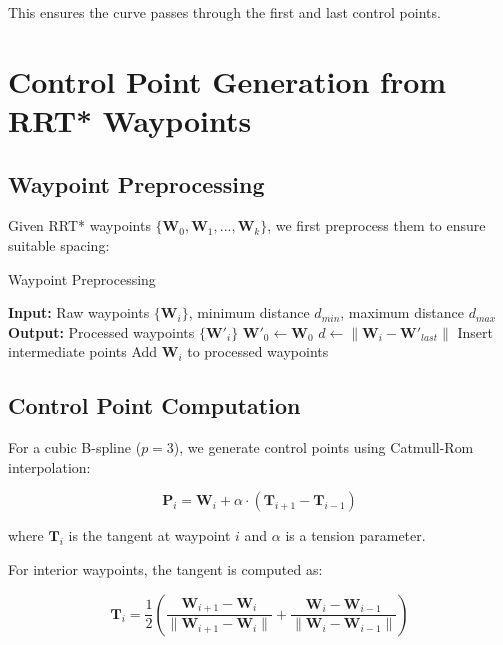 \documentclass[11pt]{article}
\begin{document}
This ensures the curve passes through the first and last control points.

\section{Control Point Generation from RRT* Waypoints}

\subsection{Waypoint Preprocessing}

Given RRT* waypoints $\{\mathbf{W}_0, \mathbf{W}_1, ..., \mathbf{W}_k\}$, we first preprocess them to ensure suitable spacing:

\begin{algorithm}
\caption{Waypoint Preprocessing}
\begin{algorithmic}
\STATE \textbf{Input:} Raw waypoints $\{\mathbf{W}_i\}$, minimum distance $d_{min}$, maximum distance $d_{max}$
\STATE \textbf{Output:} Processed waypoints $\{\mathbf{W}'_i\}$
\STATE $\mathbf{W}'_0 \leftarrow \mathbf{W}_0$
    \STATE $d \leftarrow \|\mathbf{W}_i - \mathbf{W}'_{last}\|$
            \STATE Insert intermediate points
        \ENDIF
        \STATE Add $\mathbf{W}_i$ to processed waypoints
    \ENDIF
\ENDFOR
\end{algorithmic}
\end{algorithm}

\subsection{Control Point Computation}

For a cubic B-spline ($p = 3$), we generate control points using Catmull-Rom interpolation:

\begin{equation}
\mathbf{P}_i = \mathbf{W}_i + \alpha \cdot (\mathbf{T}_{i+1} - \mathbf{T}_{i-1})
\end{equation}

where $\mathbf{T}_i$ is the tangent at waypoint $i$ and $\alpha$ is a tension parameter.

For interior waypoints, the tangent is computed as:

\begin{equation}
\mathbf{T}_i = \frac{1}{2} \left( \frac{\mathbf{W}_{i+1} - \mathbf{W}_i}{\|\mathbf{W}_{i+1} - \mathbf{W}_i\|} + \frac{\mathbf{W}_i - \mathbf{W}_{i-1}}{\|\mathbf{W}_i - \mathbf{W}_{i-1}\|} \right)
\end{equation}
\end{document}
